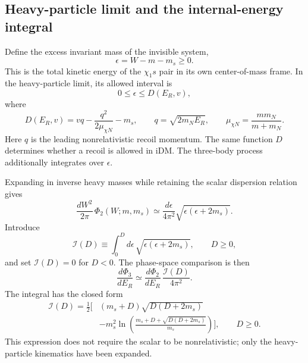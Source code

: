 \documentclass[prd,showpacs,preprintnumbers,amsmath,amssymb,twocolumn,
superscriptaddress,notitlepage]{revtex4-2}
\begin{document}
\subsection{Heavy-particle limit and the internal-energy integral}

Define the excess invariant mass of the invisible system,
\begin{equation}
\epsilon=W-m-m_s\geq0.
\end{equation}
This is the total kinetic energy of the $\chi_1s$ pair in its own
center-of-mass frame. In the heavy-particle limit, its allowed interval is
\begin{equation}
0\leq\epsilon\leq D(E_R,v),
\end{equation}
where
\begin{equation}
\boxed{
D(E_R,v)=vq-\frac{q^2}{2\mu_{\chi N}}-m_s,\qquad
q=\sqrt{2m_NE_R},\qquad
\mu_{\chi N}=\frac{mm_N}{m+m_N}.
}
\label{eq:phase-D}
\end{equation}
Here $q$ is the leading nonrelativistic recoil momentum.
The same function $D$ determines whether a recoil is allowed in iDM.
The three-body process additionally integrates over $\epsilon$.

Expanding in inverse heavy masses while retaining the scalar dispersion
relation gives
\begin{equation}
\frac{dW^2}{2\pi}\,\Phi_2(W;m,m_s)
\simeq
\frac{d\epsilon}{4\pi^2}
\sqrt{\epsilon(\epsilon+2m_s)}.
\label{eq:phase-internal-heavy}
\end{equation}
Introduce
\begin{equation}
\boxed{
\mathcal{I}(D)\equiv
\int_0^D d\epsilon\,\sqrt{\epsilon(\epsilon+2m_s)},
\qquad D\geq0,
}
\label{eq:phase-I-definition}
\end{equation}
and set $\mathcal{I}(D)=0$ for $D<0$.
The phase-space comparison is then
\begin{equation}
\boxed{
\frac{d\Phi_3}{dE_R}
\simeq
\frac{d\Phi_2}{dE_R}\,
\frac{\mathcal{I}(D)}{4\pi^2}.
}
\label{eq:phase-density-ratio}
\end{equation}
The integral has the closed form
\begin{equation}
\boxed{\begin{aligned}
\mathcal{I}(D)=\frac12\Bigg[
&(m_s+D)\sqrt{D(D+2m_s)}\\
&-m_s^2\ln\!\left(
\frac{m_s+D+\sqrt{D(D+2m_s)}}{m_s}
\right)
\Bigg],\qquad D\geq0.
\end{aligned}}
\label{eq:phase-I-closed}
\end{equation}
This expression does not require the scalar to be nonrelativistic;
only the heavy-particle kinematics have been expanded.
\end{document}
